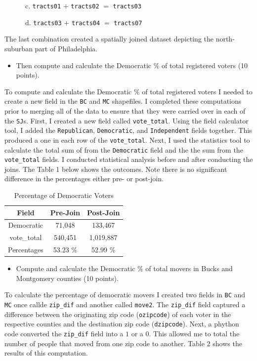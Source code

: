\documentclass[]{article}
\providecommand{\tightlist}{%
  \setlength{\itemsep}{0pt}\setlength{\parskip}{0pt}}
\begin{document}
~~~~~~c. \texttt{tracts01} \(+\) \texttt{tracts02} \(=\)
\texttt{tracts03}

~~~~~~d. \texttt{tracts03} \(+\) \texttt{tracts04} \(=\)
\texttt{tracts07}

The last combination created a spatially joined dataset depicting the
north-suburban part of Philadelphia.

\begin{itemize}
\tightlist
\item
  Then compute and calculate the Democratic \(\%\) of total registered
  voters (10 points).
\end{itemize}

To compute and calculate the Democratic \(\%\) of total registered
voters I needed to create a new field in the \texttt{BC} and \texttt{MC}
shapefiles. I completed these computations prior to merging all of the
data to ensure that they were carried over in each of the \texttt{SJ}s.
First, I created a new field called \texttt{vote\_total}. Using the
field calculator tool, I added the \texttt{Republican},
\texttt{Democratic}, and \texttt{Independent} fields together. This
produced a one in each row of the \texttt{vote\_total}. Next, I used the
statistics tool to calculate the total sum of from the
\texttt{Democratic} field and the the sum from the \texttt{vote\_total}
fields. I conducted statistical analysis before and after conducting the
joins. The Table 1 below shows the outcomes. Note there is no
significant difference in the percentages either pre- or post-join.

\begin{table}[]
\centering
\caption{Percentage of Democratic Voters}
\begin{tabular}{ccc}
Field       & Pre-Join & Post-Join \\
\hline
Democratic  & 71,048   & 133,467   \\
vote\_total & 540,451  & 1,019,887 \\
\hline
\hline
Percentages & 53.23 \% & 52.99 \% 
\end{tabular}
\end{table}

\begin{itemize}
\tightlist
\item
  Compute and calculate the Democratic \(\%\) of total movers in Bucks
  and Montgomery counties (10 points).
\end{itemize}

To calculate the percentage of democratic movers I created two fields in
\texttt{BC} and \texttt{MC} once callde \texttt{zip\_dif} and another
called \texttt{move2}. The \texttt{zip\_dif} field captured a difference
between the originating zip code (\texttt{ozipcode}) of each voter in
the respective counties and the destination zip code
(\texttt{dzipcode}). Next, a phython code converted the
\texttt{zip\_dif} field into a \(1\) or a \(0\). This allowed me to
total the number of people that moved from one zip code to another.
Table 2 shows the results of this computation.
\end{document}
